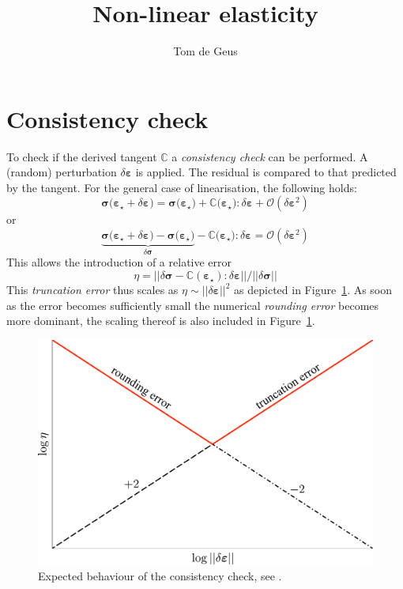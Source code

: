 \documentclass[garamond]{goose-article}
\title{Non-linear elasticity}
\author[1]{Tom de Geus}
\begin{document}
\maketitle



\section{Consistency check}

To check if the derived tangent $\mathbb{C}$ a \emph{consistency check} can be performed. A (random) perturbation $\delta \bm{\varepsilon}$ is applied. The residual is compared to that predicted by the tangent. For the general case of linearisation, the following holds:
%
\begin{equation}
  \bm{\sigma}\big( \bm{\varepsilon}_\star + \delta \bm{\varepsilon} \big) =
  \bm{\sigma}\big( \bm{\varepsilon}_\star \big) +
  \mathbb{C} \big( \bm{\varepsilon}_\star \big) : \delta \bm{\varepsilon} +
  \mathcal{O}(\delta \bm{\varepsilon}^2)
\end{equation}
%
or
%
\begin{equation}
  \underbrace{
    \bm{\sigma}\big( \bm{\varepsilon}_\star + \delta \bm{\varepsilon} \big) -
    \bm{\sigma}\big( \bm{\varepsilon}_\star \big)
  }_{
    \displaystyle \delta \bm{\sigma}
  } -
  \mathbb{C} \big( \bm{\varepsilon}_\star \big) : \delta \bm{\varepsilon} =
  \mathcal{O}(\delta \bm{\varepsilon}^2)
\end{equation}
%
This allows the introduction of a relative error
%
\begin{equation}
  \eta =
  \Big|\Big|
    \delta \bm{\sigma} -
    \mathbb{C}(\bm{\varepsilon}_\star) : \delta \bm{\varepsilon}
  \Big|\Big|
  /
  \Big|\Big| \delta \bm{\sigma} \Big|\Big|
\end{equation}
%
This \emph{truncation error} thus scales as $\eta \sim || \delta \bm{\varepsilon} ||^2$ as depicted in Figure~\ref{fig:consistency:expected}. As soon as the error becomes sufficiently small the numerical \emph{rounding error} becomes more dominant, the scaling thereof is also included in Figure~\ref{fig:consistency:expected}.

\begin{figure}[htp]
  \centering
  \includegraphics[width=.5\textwidth]{figures/consistency}
  \caption{Expected behaviour of the consistency check, see \citet[p.~9]{Heath2002}.}
  \label{fig:consistency:expected}
\end{figure}
\end{document}
